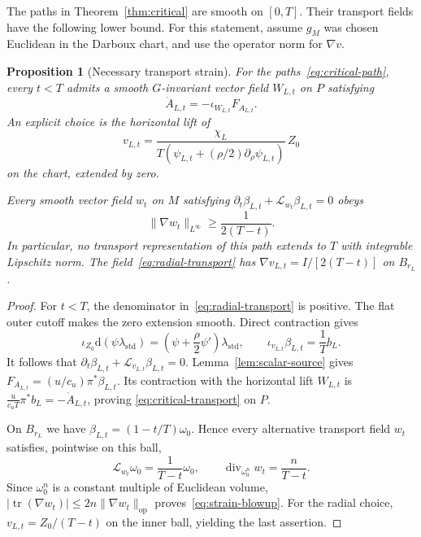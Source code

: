 \documentclass[11pt,a4paper]{article}
\numberwithin{equation}{section}
\newtheorem{proposition}[theorem]{Proposition}
\theoremstyle{definition}
\theoremstyle{remark}
\newcommand{\Lie}{\mathcal L}
\newcommand{\dd}{\mathrm d}
\begin{document}
The paths in Theorem~\ref{thm:critical} are smooth on $[0,T]$.
Their transport fields have the following lower bound. For this statement,
assume $g_M$ was chosen Euclidean in the Darboux chart, and use the operator
norm for $\nabla v$.

\begin{proposition}[Necessary transport strain]\label{prop:strain}
For the paths~\eqref{eq:critical-path}, every $t<T$ admits a smooth
$G$-invariant vector field $W_{L,t}$ on $P$ satisfying
\begin{equation}\label{eq:critical-transport}
 \dot A_{L,t}=-\iota_{W_{L,t}}F_{A_{L,t}}.
\end{equation}
An explicit choice is the horizontal lift of
\begin{equation}\label{eq:radial-transport}
 v_{L,t}=
 \frac{\chi_L}
 {T\left(\psi_{L,t}+(\rho/2)\partial_\rho \psi_{L,t}\right)}\,Z_0
\end{equation}
on the chart, extended by zero.

Every smooth vector field $w_t$ on $M$ satisfying
$\partial_t\beta_{L,t}+\Lie_{w_t}\beta_{L,t}=0$ obeys
\begin{equation}\label{eq:strain-blowup}
 \|\nabla w_t\|_{L^\infty}\geq\frac{1}{2(T-t)}.
\end{equation}
In particular, no transport representation of this path extends to $T$ with
integrable Lipschitz norm. The field~\eqref{eq:radial-transport} has
$\nabla v_{L,t}=I/[2(T-t)]$ on $B_{r_L}$.
\end{proposition}

\begin{proof}
For $t<T$, the denominator in~\eqref{eq:radial-transport} is positive.
The flat outer cutoff makes the zero extension smooth. Direct contraction
gives
\[
 \iota_{Z_0}\dd(\psi\lambda_{\mathrm{std}})
       =\left(\psi+\frac\rho2\psi'\right)\lambda_{\mathrm{std}},
 \qquad
 \iota_{v_{L,t}}\beta_{L,t}=\frac1T b_L.
\]
It follows that
$\partial_t\beta_{L,t}+\Lie_{v_{L,t}}\beta_{L,t}=0$.
Lemma~\ref{lem:scalar-source} gives
$F_{A_{L,t}}=(u/c_u)\pi^*\beta_{L,t}$. Its contraction with the horizontal
lift $W_{L,t}$ is $\frac{u}{c_u T}\pi^*b_L=-\dot A_{L,t}$, proving
\eqref{eq:critical-transport} on $P$.

On $B_{r_L}$ we have
$\beta_{L,t}=(1-t/T)\omega_0$. Hence every alternative transport field
$w_t$ satisfies, pointwise on this ball,
\[
 \Lie_{w_t}\omega_0=\frac{1}{T-t}\omega_0,
 \qquad
 \operatorname{div}_{\omega_0^n}w_t=\frac{n}{T-t}.
\]
Since $\omega_0^n$ is a constant multiple of Euclidean volume,
$|\operatorname{tr}(\nabla w_t)|\leq2n\|\nabla w_t\|_{\mathrm{op}}$
proves~\eqref{eq:strain-blowup}. For the radial choice,
$v_{L,t}=Z_0/(T-t)$ on the inner ball, yielding the last assertion.
\end{proof}
\end{document}
